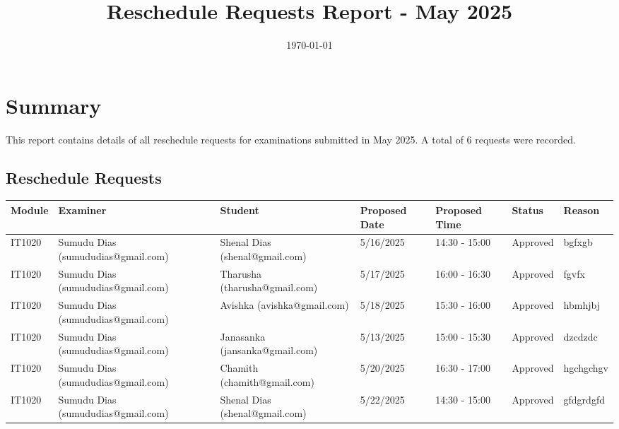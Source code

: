 \documentclass[a4paper,12pt]{article}
\title{Reschedule Requests Report - May 2025}
\author{}
\date{\today}
\begin{document}
\maketitle

\section*{Summary}
This report contains details of all reschedule requests for examinations submitted in May 2025. A total of 6 requests were recorded.

\begin{landscape}
\section*{Reschedule Requests}
\begin{longtable}{p{3cm}|p{3cm}|p{3cm}|p{3cm}|p{3cm}|p{3cm}|p{3cm}}
\toprule
\textbf{Module} & \textbf{Examiner} & \textbf{Student} & \textbf{Proposed Date} & \textbf{Proposed Time} & \textbf{Status} & \textbf{Reason} \\
\midrule
\endhead

IT1020 &
Sumudu Dias (sumududias@gmail.com) &
Shenal Dias (shenal@gmail.com) &
5/16/2025 &
14:30 - 15:00 &
Approved &
bgfxgb \\

IT1020 &
Sumudu Dias (sumududias@gmail.com) &
Tharusha (tharusha@gmail.com) &
5/17/2025 &
16:00 - 16:30 &
Approved &
fgvfx \\

IT1020 &
Sumudu Dias (sumududias@gmail.com) &
Avishka (avishka@gmail.com) &
5/18/2025 &
15:30 - 16:00 &
Approved &
hbmhjbj \\

IT1020 &
Sumudu Dias (sumududias@gmail.com) &
Janasanka (jansanka@gmail.com) &
5/13/2025 &
15:00 - 15:30 &
Approved &
dzcdzdc \\

IT1020 &
Sumudu Dias (sumududias@gmail.com) &
Chamith (chamith@gmail.com) &
5/20/2025 &
16:30 - 17:00 &
Approved &
hgchgchgv \\

IT1020 &
Sumudu Dias (sumududias@gmail.com) &
Shenal Dias (shenal@gmail.com) &
5/22/2025 &
14:30 - 15:00 &
Approved &
gfdgrdgfd \\

\bottomrule
\end{longtable}
\end{landscape}
\end{document}
